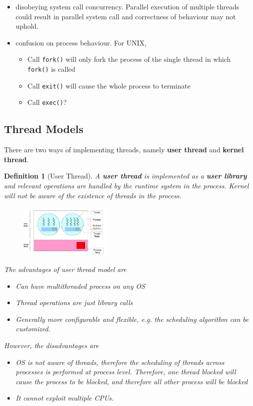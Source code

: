 \documentclass[12pt]{article}
\newtheorem{definition}{Definition}[section]
\theoremstyle{definition}
\begin{document}
\begin{itemize}
  \item disobeying system call concurrency. Parallel execution of multiple threads could result in parallel system call and correctness of behaviour may not uphold.
  \item confusion on process behaviour. For UNIX,
  \begin{itemize}
    \item Call \texttt{fork()} will only fork the process of the single thread in which \texttt{fork()} is called
    \item Call \texttt{exit()} will cause the whole process to terminate
    \item Call \texttt{exec()}?
  \end{itemize}
\end{itemize}
\subsection{Thread Models}
There are two ways of implementing threads, namely \textbf{user thread} and \textbf{kernel thread}.
\begin{definition}[User Thread]
A \textbf{user thread} is implemented as a \textbf{user library} and relevant operations are handled by the runtime system in the process. Kernel will not be aware of the existence of threads in the process.
\begin{figure}[h]
\centering
\includegraphics[width=0.4\textwidth]{4_1.png}
\end{figure}
The advantages of user thread model are
\begin{itemize}
  \item Can have multithreaded process on \textit{any} OS
  \item Thread operations are just library calls
  \item Generally more configurable and flexible, e.g. the scheduling algorithm can be customized.
\end{itemize}
However, the disadvantages are
\begin{itemize}
  \item OS is not aware of threads, therefore the scheduling of threads across processes is performed at process level. Therefore, one thread blocked will cause the process to be blocked, and therefore all other process will be blocked
  \item It cannot exploit multiple CPUs.
\end{itemize}
\end{definition}
\end{document}
